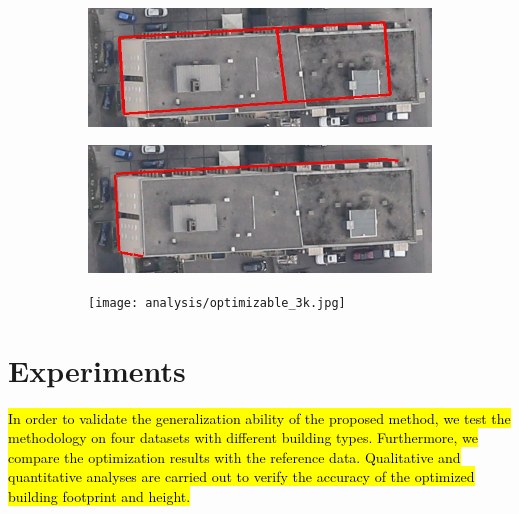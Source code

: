 \documentclass[remotesensing,article,accept,moreauthors,pdftex,10pt,a4paper]{mdpi}
\theoremstyle{mdpi}
\newcounter{ex}
\newcounter{re}
\begin{document}
\begin{figure}[H]
    \centering
       \begin{subfigure}[tbp]{0.43\columnwidth}
           \centering
           
           \includegraphics[width=\textwidth]{analysis/proj_3k.png}
           \caption[]{}
           {{\small }} 
           \label{fig:3a}
       \end{subfigure}
       \hfill
       \begin{subfigure}[tbp]{0.4\columnwidth}
           \centering
           \includegraphics[width=\textwidth]{analysis/optimizable_3k.png}
           \caption[]{}
           {{\small }}
           \label{fig:3b}
       \end{subfigure}
       \begin{subfigure}[tbp]{0.9\columnwidth}
           \centering
           \texttt{[image: analysis/optimizable\_3k.jpg]}
           \caption[]{}
           {{\small }}
           \label{fig:3c}
       \end{subfigure}
       \vspace{-12pt}
\caption{}
       \label{fig:optimizable}
\end{figure}


\section{Experiments}\label{sec:exp}
\hl{In order to validate the generalization ability of the proposed method, we test the methodology on four datasets with different building types. Furthermore, we compare the optimization results with the reference data. Qualitative and quantitative analyses are carried out to verify the accuracy of the optimized building footprint and height.} 
\end{document}
